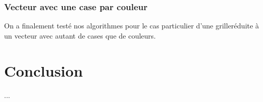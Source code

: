 \documentclass[12pt,a4paper]{article}
\begin{document}
\section{Vecteur avec une case par couleur}
On a finalement test\'e nos algorithmes pour le cas particulier d'une griller\'eduite \`a un vecteur avec autant de cases que de couleurs.

\newpage

\part*{Conclusion}
...
\end{document}
